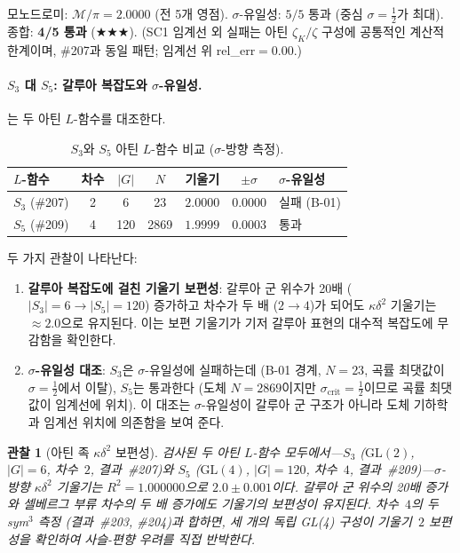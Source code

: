 \documentclass[11pt, a4paper]{article}
\theoremstyle{plain}
\newtheorem{observation}[theorem]{관찰}
\theoremstyle{definition}
\newcommand{\kap}{\kappa}             %
\newcommand{\mono}{\mathcal{M}}       %
\begin{document}
모노드로미: $\mono/\pi=2.0000$ (전 5개 영점).
$\sigma$-유일성: $5/5$ 통과 (중심 $\sigma=\tfrac{1}{2}$가 최대).
종합: \textbf{4/5 통과} ($\bigstar\bigstar\bigstar$).
(SC1 임계선 외 실패는 아틴 $\zeta_K/\zeta$ 구성에 공통적인 계산적 한계이며,
\#207과 동일 패턴; 임계선 위 rel\_err$=0.00$.)

\paragraph{$S_{3}$ 대 $S_{5}$: 갈루아 복잡도와 $\sigma$-유일성.}
는 두 아틴 $L$-함수를 대조한다.

\begin{table}[ht]
\centering
\caption{$S_{3}$와 $S_{5}$ 아틴 $L$-함수 비교 ($\sigma$-방향 측정).}
\label{tab:s3-s5-compare}
\begin{tabular}{@{}lcccccl@{}}
\toprule
$L$-\textbf{함수} & \textbf{차수} & $|G|$ & $N$
  & \textbf{기울기} & $\pm\sigma$ & $\sigma$\textbf{-유일성} \\
\midrule
$S_{3}$ (\#207) & 2 & 6   & 23   & $2.0000$ & $0.0000$ & 실패 (B-01) \\
$S_{5}$ (\#209) & 4 & 120 & 2869 & $1.9999$ & $0.0003$ & 통과 \\
\bottomrule
\end{tabular}
\end{table}

두 가지 관찰이 나타난다:
\begin{enumerate}
  \item \textbf{갈루아 복잡도에 걸친 기울기 보편성}: 갈루아 군 위수가
    20배 ($|S_{3}|=6 \to |S_{5}|=120$) 증가하고 차수가 두 배
    ($2\to 4$)가 되어도 $\kap\delta^{2}$ 기울기는 $\approx 2.0$으로
    유지된다. 이는 보편 기울기가 기저 갈루아 표현의 대수적 복잡도에
    무감함을 확인한다.
  \item \textbf{$\sigma$-유일성 대조}: $S_{3}$은 $\sigma$-유일성에
    실패하는데 (B-01 경계, $N=23$, 곡률 최댓값이 $\sigma=\tfrac{1}{2}$에서
    이탈), $S_{5}$는 통과한다 (도체 $N=2869$이지만
    $\sigma_{\mathrm{crit}}=\tfrac{1}{2}$이므로 곡률 최댓값이 임계선에
    위치). 이 대조는 $\sigma$-유일성이 갈루아 군 구조가 아니라
    도체 기하학과 임계선 위치에 의존함을 보여 준다.
\end{enumerate}

\begin{observation}[아틴 족 $\kap\delta^{2}$ 보편성]
\label{obs:artin_universal}
검사된 두 아틴 $L$-함수 모두에서---$S_{3}$ ($\mathrm{GL}(2)$,
$|G|=6$, 차수~$2$, 결과~\#207)와 $S_{5}$ ($\mathrm{GL}(4)$,
$|G|=120$, 차수~$4$, 결과~\#209)---$\sigma$-방향 $\kap\delta^{2}$
기울기는 $R^{2}=1.000000$으로 $2.0\pm 0.001$이다.
갈루아 군 위수의 20배 증가와 셀베르그 부류 차수의 두 배 증가에도
기울기의 보편성이 유지된다.
차수~$4$의 두 sym$^{3}$ 측정 (결과~\#203, \#204)과 합하면,
세 개의 독립 GL(4) 구성이 기울기~$2$ 보편성을 확인하여
사슬-편향 우려를 직접 반박한다.
\end{observation}
\end{document}
